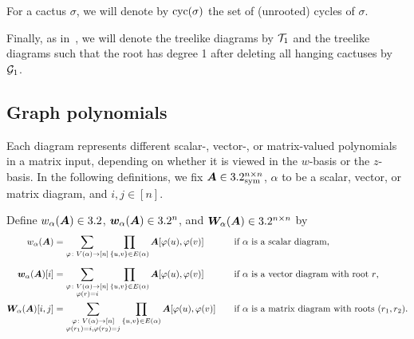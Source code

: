 \noindent For a cactus $\sigma$, we will denote
by $\mathrm{cyc}(\sigma)$ the set of (unrooted)
cycles of $\sigma$. 

Finally, as in~, we will denote the treelike diagrams by ${\cal T}_1$ and the treelike diagrams such that the root has degree 1 after deleting all hanging cactuses by ${\cal G}_1$.

\subsection{Graph polynomials}
\label{sec:polynomial-definitions}

Each diagram represents different scalar-, vector-, or matrix-valued polynomials 
in a matrix input, depending on whether it is viewed
in the $w$-basis or the $z$-basis. In the following
definitions,
we fix ${\bm A}\in 3.2_{\mathrm{sym}}^{n\times n}$, $\alpha$ to be a scalar, vector, or matrix diagram, and
$i,j\in [n]$.

\begin{definition}
    \label{def:w-basis}
    Define $w_\alpha({\bm A})
    \in 3.2$, ${\bm w}_\alpha({\bm A})\in 3.2^n$, and ${\bm W}_\alpha({\bm A})\in 3.2^{n\times n}$ by
    \begin{alignat*}{2}
        w_\alpha({\bm A}) &= \sum_{\substack{\varphi\colon V(\alpha)\to [n]}} \prod_{\{u,v\}\in E(\alpha)} {\bm A}[\varphi(u),\varphi(v)] \quad&& \text{if $\alpha$ is a scalar diagram,}\\[2mm]
        {\bm w}_\alpha({\bm A})[i] &= \sum_{\substack{\varphi\colon V(\alpha)\to [n]\\\varphi(r) = i}} \prod_{\{u,v\}\in E(\alpha)} {\bm A}[\varphi(u),\varphi(v)] \quad&&\text{if $\alpha$ is a vector diagram with root $r$,}\\
        {\bm W}_\alpha({\bm A})[i,j] &= \sum_{\substack{\varphi\colon V(\alpha)\to [n]\\\varphi(r_1)=i,\varphi(r_2)=j}} \prod_{\{u,v\}\in E(\alpha)} {\bm A}[\varphi(u),\varphi(v)] \quad&&\text{if $\alpha$ is a matrix diagram with roots $(r_1,r_2)$.}
    \end{alignat*}   
\end{definition}

